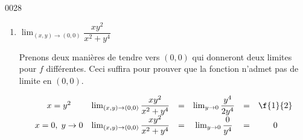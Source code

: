 \begin{corrige}{0028}
\begin{enumerate}
\begin{alternative}
			      \[\begin{array}{cccc}

					      x= 1, \; y\rightarrow  1 & \lim_{(x,y)\rightarrow (1,1)} \dfrac{x-y}{\ln(x^2+y^2-1)}  & =   & \lim_{y\rightarrow 1}\dfrac{1-y}{\ln(y^2)} \\
					                               &                                                            & =^H & \lim\dfrac{-1}{-2y/y^2} \;= \; \f{1}{2}    \\

					      x\rightarrow 1, \; y=1   & \lim_{(x,y)\rightarrow (1,1)} \dfrac{x-y}{\ln(x^2+y^2-1) } & =   & \lim_{x\rightarrow 1}\dfrac{x}{\ln(x^2)}   \\
					                               &                                                            & =^H & \lim\dfrac{1}{-2x/x^2} \;= \; -\f{1}{2}
				      \end{array}\]

		      \end{alternative}

		\item $\lim_{(x,y)\rightarrow (0,0)} \dfrac{xy^2}{x^2+y^4}$

		      Prenons deux manières de tendre vers $(0,0)$ qui donneront deux limites pour $f$ différentes. Ceci suffira pour prouver que la fonction n'admet pas de limite en $(0,0)$.

		      \[\begin{array}{cccccc} x=y^2         & \lim_{(x,y)\rightarrow (0,0)} \dfrac{xy^2}{x^2+y^4} & = & \lim_{y\rightarrow 0}\dfrac{y^4}{2y^4} & = & \f{1}{2} \\

             x=0, \; y\rightarrow 0 & \lim_{(x,y)\rightarrow (0,0)} \dfrac{xy^2}{x^2+y^4} & = & \lim_{y\rightarrow 0}\dfrac{0}{y^4}    & = & 0\end{array}\]

	\end{enumerate}

\end{corrige}
